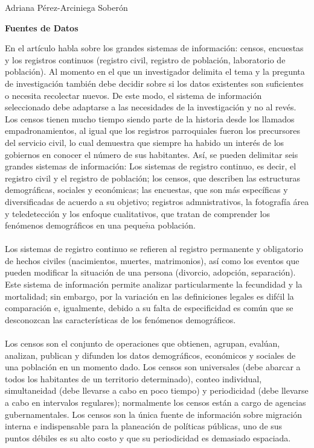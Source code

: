 \documentclass[10pt,spanish,letterpaper]{article}
\theoremstyle{plain}
\begin{document}
\begin{flushleft}
Adriana P\'erez-Arciniega Sober\'on
\end{flushleft}
\begin{center}
\textbf{Fuentes de Datos}
\end{center}
En el art\'iculo \cite{tabutin1997sistemas} habla sobre los grandes sistemas de informaci\'on: censos, encuestas y los registros continuos (registro civil, registro de poblaci\'on, laboratorio de poblaci\'on). Al momento en el que un investigador delimita el tema y la pregunta de investigaci\'on tambi\'en debe decidir sobre si los datos existentes son suficientes o necesita recolectar nuevos. De este modo, el sistema de informaci\'on seleccionado debe adaptarse a las necesidades de la investigaci\'on y no al rev\'es.\'
\\
Los censos tienen mucho tiempo siendo parte de la historia desde los llamados empadronamientos, al igual que los registros parroquiales fueron los precursores del servicio civil, lo cual demuestra que siempre ha habido un inter\'es de los gobiernos en conocer el n\'umero de sus habitantes. As\'i, se pueden delimitar seis grandes sistemas de informaci\'on: Los sistemas de registro continuo, es decir, el registro civil y el registro de poblaci\'on; los censos, que describen las estructuras demogr\'aficas, sociales y econ\'omicas; las encuestas, que son m\'as espec\'ificas y diversificadas de acuerdo a su objetivo; registros admnistrativos, la fotograf\'ia \'area y teledetecci\'on y los enfoque cualitativos, que tratan de comprender los fen\'omenos demogr\'aficos en una peque$\tilde{n}$a poblaci\'on.\\
\\
Los sistemas de registro continuo se refieren al registro permanente y obligatorio de hechos civiles (nacimientos, muertes, matrimonios), as\'i como los eventos que pueden modificar la situaci\'on de una persona (divorcio, adopci\'on, separaci\'on). Este sistema de informaci\'on permite analizar particularmente la fecundidad y la mortalidad; sin embargo, por la variaci\'on en las definiciones legales   es dif\'cil la comparaci\'on e, igualmente, debido a su falta de especificidad es com\'un que se desconozcan las caracter\'isticas de los fen\'omenos demogr\'aficos.\\
\\
Los censos son el conjunto de operaciones que obtienen, agrupan, eval\'uan, analizan, publican y difunden los datos demogr\'aficos, econ\'omicos y sociales de una poblaci\'on en un momento dado. Los censos son universales (debe abarcar a todos los habitantes de un territorio determinado), conteo individual, simultaneidad (debe llevarse a cabo en poco tiempo) y periodicidad (debe llevarse a cabo en intervalos regulares); normalmente los censos est\'an a cargo de agencias gubernamentales. Los censos son la \'unica fuente de informaci\'on sobre migraci\'on interna e indispensable para la planeaci\'on de pol\'iticas p\'ublicas, uno de sus puntos d\'ebiles es su alto costo y que su periodicidad es demasiado espaciada.\\
\end{document}
